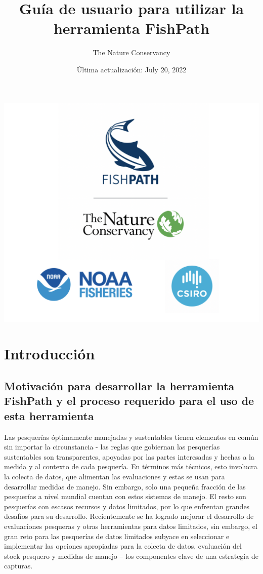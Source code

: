 \documentclass[
  11pt,
]{book}
\title{Guía de usuario para utilizar la herramienta FishPath}
\author{The Nature Conservancy}
\date{Última actualización: July 20, 2022}
\begin{document}
\maketitle

{
\setcounter{tocdepth}{1}
\tableofcontents
}
\hypertarget{section}{%
\chapter*{}\label{section}}

\begin{center}\includegraphics[width=0.75\linewidth]{images/3-logos} \end{center}

\hypertarget{intro}{%
\chapter{Introducción}\label{intro}}

\hypertarget{motivation}{%
\section{Motivación para desarrollar la herramienta FishPath y el proceso requerido para el uso de esta herramienta}\label{motivation}}

Las pesquerías óptimamente manejadas y sustentables tienen elementos en común sin importar la circunstancia - las reglas que gobiernan las pesquerías sustentables son transparentes, apoyadas por las partes interesadas y hechas a la medida y al contexto de cada pesquería. En términos más técnicos, esto involucra la colecta de datos, que alimentan las evaluaciones y estas se usan para desarrollar medidas de manejo. Sin embargo, solo una pequeña fracción de las pesquerías a nivel mundial cuentan con estos sistemas de manejo. El resto son pesquerías con escasos recursos y datos limitados, por lo que enfrentan grandes desafíos para su desarrollo. Recientemente se ha logrado mejorar el desarrollo de evaluaciones pesqueras y otras herramientas para datos limitados, sin embargo, el gran reto para las pesquerías de datos limitados subyace en seleccionar e implementar las opciones apropiadas para la colecta de datos, evaluación del stock pesquero y medidas de manejo -- los componentes clave de una estrategia de capturas.
\end{document}
